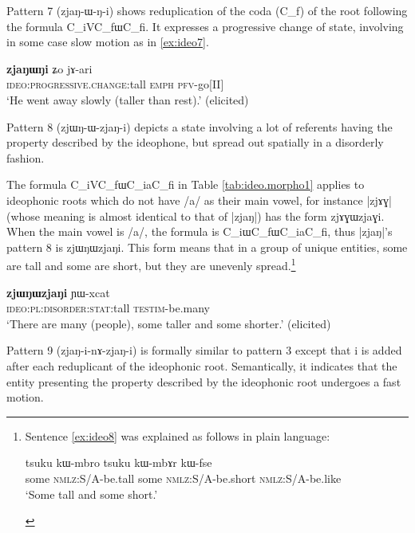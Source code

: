 \documentclass[oldfontcommands,oneside,a4paper,11pt]{article}
\newcommand{\ipa}[1]{{\phon \mbox{#1}}} %
\begin{document}
 Pattern 7 (\ipa{zjaŋ-ɯ-ŋ-i}) shows   reduplication of the coda (C_f) of the root following the formula C_iVC_f\ipa{ɯ}C_f\ipa{i}. It  expresses a progressive change of state, involving in some case slow motion as in \ref{ex:ideo7}.
 
  \begin{exe} 
\ex  \label{ex:ideo7}
\gll 
\ipa{\textbf{zjaŋɯŋi}}  	\ipa{ʑo}  	\ipa{jɤ-ari}  \\
  \textsc{ideo:progressive.change}:tall  \textsc{emph} \textsc{pfv}-go[II] \\
\glt `He went away slowly (taller than rest).'  (elicited)
 \end{exe}


Pattern 8 (\ipa{zjɯŋ-ɯ-zjaŋ-i}) depicts a state involving a lot of referents having the property described by the ideophone, but spread out spatially in a disorderly fashion. 
	
	The formula C_iVC_f\ipa{ɯ}C_i\ipa{a}C_f\ipa{i}  in Table \ref{tab:ideo.morpho1} applies to ideophonic roots  which do  not have /a/ as their main vowel, for instance |\ipa{zjɤɣ}| (whose meaning is almost identical to that of |\ipa{zjaŋ}|) has the form \ipa{zjɤɣɯzjaɣi}. When the main vowel is /a/, the formula is C_i\ipa{ɯ}C_f\ipa{ɯ}C_i\ipa{a}C_f\ipa{i}, thus |\ipa{zjaŋ}|'s pattern 8 is \ipa{zjɯŋɯzjaŋi}. This form means that in a group of unique entities, some are tall and some are short, but  they are unevenly spread.\footnote{Sentence \ref{ex:ideo8} was explained as follows in plain language:
 
 \begin{exe} 
\ex  \label{ex:zjWNWzjaNi:expl}
\gll 
 \ipa{tsuku}  	\ipa{kɯ-mbro}  	\ipa{tsuku}  	\ipa{kɯ-mbɤr}  	\ipa{kɯ-fse}  \\
 some \textsc{nmlz}:S/A-be.tall some \textsc{nmlz}:S/A-be.short \textsc{nmlz}:S/A-be.like \\
 \glt `Some tall and some short.'   
  \end{exe} }
    \begin{exe} 
\ex  \label{ex:ideo8}
\gll 
\ipa{\textbf{zjɯŋɯzjaŋi}}  	\ipa{ɲɯ-xcat}  \\
\textsc{ideo:pl:disorder:stat}:tall \textsc{testim}-be.many \\
\glt `There are many (people), some taller and some shorter.'   (elicited)
  \end{exe}

Pattern 9 (\ipa{zjaŋ-i-nɤ-zjaŋ-i}) is formally similar to pattern 3 except that \ipa{i} is added after each reduplicant of the ideophonic root. Semantically, it indicates that the entity presenting the property described by the ideophonic root undergoes a fast motion.
\end{document}
